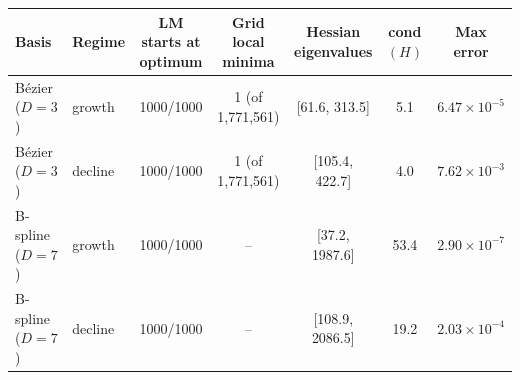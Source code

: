 \begin{tabular}{llccccc}
\toprule
Basis & Regime & LM starts at optimum & Grid local minima & Hessian eigenvalues & cond$(H)$ & Max error\\
\midrule
B\'ezier ($D=3$) & growth & 1000/1000 & 1 (of 1{,}771{,}561) & [61.6, 313.5] & 5.1 & $6.47\times10^{-5}$\\
B\'ezier ($D=3$) & decline & 1000/1000 & 1 (of 1{,}771{,}561) & [105.4, 422.7] & 4.0 & $7.62\times10^{-3}$\\
B-spline ($D=7$) & growth & 1000/1000 & -- & [37.2, 1987.6] & 53.4 & $2.90\times10^{-7}$\\
B-spline ($D=7$) & decline & 1000/1000 & -- & [108.9, 2086.5] & 19.2 & $2.03\times10^{-4}$\\
\bottomrule
\end{tabular}